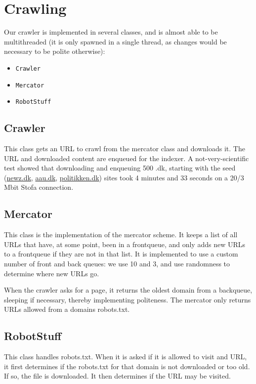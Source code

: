 \section{Crawling}
Our crawler is implemented in several classes, and is almost able to be multithreaded (it is only spawned in a single thread, as changes would be necessary to be polite otherwise):
\begin{itemize}
	\item \texttt{Crawler}
	\item \texttt{Mercator}
	\item \texttt{RobotStuff}
\end{itemize}

\subsection{Crawler}
This class gets an URL to crawl from the mercator class and downloads it. The URL and downloaded content are enqueued for the indexer. A not-very-scientific test showed that downloading and enqueuing 500 .dk, starting with the seed (\url{newz.dk}, \url{aau.dk}, \url{politikken.dk}) sites took 4 minutes and 33 seconds on a 20/3 Mbit Stofa connection.

\subsection{Mercator}
This class is the implementation of the mercator scheme. It keeps a list of all URLs that have, at some point, been in a frontqueue, and only adds new URLs to a frontqueue if they are not in that list. It is implemented to use a custom number of front and back queues: we use 10 and 3, and use randomness to determine where new URLs go.

When the crawler asks for a page, it returns the oldest domain from a backqueue, sleeping if necessary, thereby implementing politeness. The mercator only returns URLs allowed from a domains robots.txt.

\subsection{RobotStuff}
This class handles robots.txt. When it is asked if it is allowed to visit and URL, it first determines if the robots.txt for that domain is not downloaded or too old. If so, the file is downloaded. It then determines if the URL may be visited.